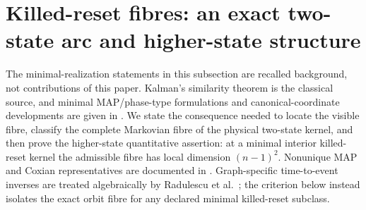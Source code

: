 \section{Killed-reset fibres: an exact two-state arc and higher-state structure}

The minimal-realization statements in this subsection are recalled background,
not contributions of this paper.  Kalman's similarity theorem is the classical
source, and minimal MAP/phase-type formulations and canonical-coordinate
developments are given in
\cite{Kalman1963LinearSystems,TelekHorvath2007MinimalMAP,
BladtNielsen2017MatrixExponential,MeszarosTelek2013DiscreteMAP2Canonical,
PappTelek2013DiscretePHCanonical}.  We state the consequence needed to locate
the visible fibre, classify the complete Markovian fibre of the physical
two-state kernel, and then prove the higher-state quantitative assertion: at a
minimal interior killed-reset kernel the admissible fibre has local dimension
\((n-1)^2\).  Nonunique MAP and Coxian representatives are documented in
\cite{RamirezCoboLilloWiper2010MAP2Nonidentifiability,
RamirezCoboLillo2012WeakEquivalentMAP,RizkBurkeWalsh2019CoxianNonuniqueness}.
Graph-specific time-to-event inverses are treated algebraically by
Radulescu et al.\ \cite{RadulescuEtAl2025TimeToEventIdentifiability}; the
criterion below instead isolates the exact orbit fibre for any declared
minimal killed-reset subclass.

